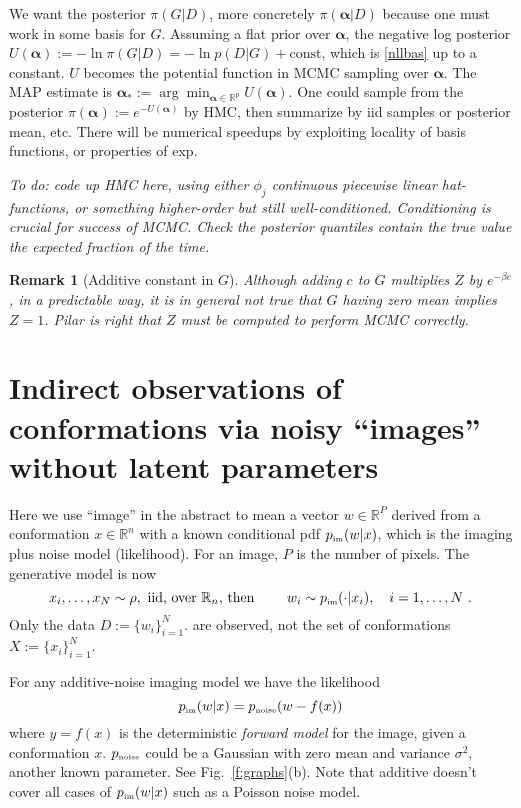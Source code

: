 \documentclass[10pt]{article}
\newcommand{\be}{\begin{equation}}
\newcommand{\ee}{\end{equation}}
\newcommand{\tbox}[1]{{\mbox{\tiny #1}}}
\newcommand{\R}{\mathbb{R}}
\newtheorem{rmk}[thm]{Remark}
\newcommand{\bt}{\beta}
\newcommand{\bal}{{\bm\alpha}}
\begin{document}
We want the posterior $\pi(G|D)$, more concretely $\pi(\bal|D)$
because one must work in some basis for $G$.
Assuming a flat prior over $\bal$, the negative log posterior
$U(\bal) := -\ln \pi(G|D) = -\ln p(D|G) + \mbox{const}$,
which is \eqref{nllbas} up to a constant.
$U$ becomes the potential function in MCMC sampling over $\bal$.
The MAP estimate is $\bal_*:=\arg\min_{\bal\in\R^p} U(\bal)$.
One could sample from the posterior $\pi(\bal):=e^{-U(\bal)}$ by HMC,
then summarize by iid samples or posterior mean, etc.
There will be numerical speedups by exploiting locality of
basis functions, or properties of exp.

{\em 
To do: code up HMC here, using either $\phi_j$ continuous piecewise
linear hat-functions, or something higher-order but still well-conditioned.
Conditioning is crucial for success of MCMC.
Check the posterior quantiles contain the true value the expected fraction
of the time.
}

\begin{rmk}[Additive constant in $G$]
  Although adding $c$ to $G$ multiplies $Z$ by $e^{-\bt c}$, in a predictable way,
  it is in general not true that $G$ having zero mean implies $Z=1$.
  Pilar is right that $Z$ must be computed to perform MCMC correctly.
  \end{rmk}




\section{Indirect observations of conformations via noisy ``images'' without
latent parameters}

Here we use ``image'' in the abstract to mean a vector
$w\in \R^P$ derived from a conformation $x\in\R^n$ with a known conditional
pdf $p_\tbox{im}(w|x)$, which is the imaging plus noise model (likelihood).
For an image, $P$ is the number of pixels.
The generative model is now
\be
x_i,\dots,x_N \sim \rho, \mbox{ iid, over $\R_n$, then }
\qquad w_i \sim p_\tbox{im}(\cdot | x_i), \quad i=1,\dots, N~.
\label{genmod2}
\ee
Only the data $D:=\{w_i\}_{i=1}^N$.
are observed, not the set of conformations $X:=\{x_i\}_{i=1}^N$.

For any additive-noise imaging model we have the likelihood
$$
p_\tbox{im}(w | x) = p_\tbox{noise}(w - f(x))
$$
where $y=f(x)$ is the deterministic {\em forward model} for the image,
given a conformation $x$.
$p_\tbox{noise}$ could be a Gaussian with zero mean and variance $\sigma^2$,
another known parameter.
See Fig.~\ref{f:graphs}(b).
Note that additive doesn't cover all cases of $p_\tbox{im}(w|x)$ such as a Poisson noise model.
\end{document}
